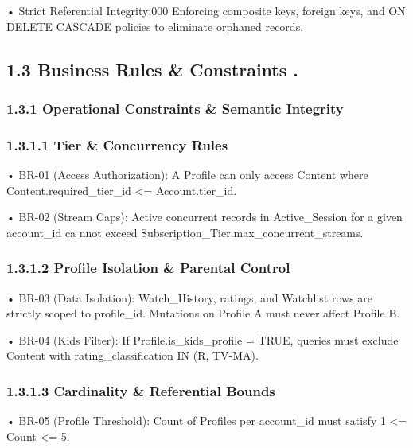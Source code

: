 • Strict Referential Integrity:000 Enforcing composite keys, foreign keys, and ON DELETE CASCADE policies to eliminate orphaned records.

\subsection*{1.3 Business Rules \& Constraints .}

\subsubsection*{1.3.1 Operational Constraints \& Semantic Integrity}

\subsubsection*{1.3.1.1 Tier \& Concurrency Rules}

• BR-01 (Access Authorization): A Profile can only access Content where Content.required\_\allowbreak{}tier\_\allowbreak{}id \textless= Account.tier\_\allowbreak{}id.

• BR-02 (Stream Caps): Active concurrent records in Active\_\allowbreak{}Session for a given account\_\allowbreak{}id ca  nnot exceed Subscription\_\allowbreak{}Tier.max\_\allowbreak{}concurrent\_\allowbreak{}streams.

\subsubsection*{1.3.1.2 Profile Isolation \& Parental Control}

• BR-03 (Data Isolation): Watch\_\allowbreak{}History, ratings, and Watchlist rows are strictly scoped to profile\_\allowbreak{}id. Mutations on Profile A must never affect Profile B.

• BR-04 (Kids Filter): If Profile.is\_\allowbreak{}kids\_\allowbreak{}profile = TRUE, queries must exclude Content with rating\_\allowbreak{}classification IN (\textquotesingle R\textquotesingle, \textquotesingle TV-MA\textquotesingle).

\subsubsection*{1.3.1.3 Cardinality \& Referential Bounds}

• BR-05 (Profile Threshold): Count of Profiles per account\_\allowbreak{}id must satisfy 1 \textless= Count \textless= 5.

